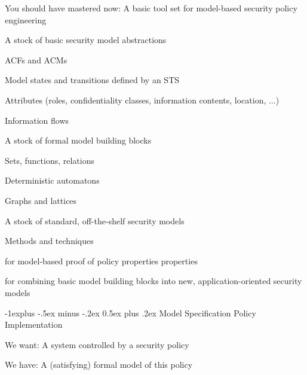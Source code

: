 \documentclass[a4paper]{article}
\makeatletter
\renewcommand{\subsection}{\@startsection{subsection}{2}{0mm}%
                                {-1explus -.5ex minus -.2ex}%
                                {0.5ex plus .2ex}%
                                {\normalfont\normalsize\bfseries}}
\makeatother
\begin{document}
\begin{multicols}{3}
    You should have mastered now: A basic tool set for model-based security policy engineering
    \begin{itemize*}
        \item A stock of basic security model abstractions
        \begin{itemize*}
            \item ACFs and ACMs
            \item Model states and transitions defined by an STS
            \item Attributes (roles, confidentiality classes, information contents, location, ...)
            \item Information flows
        \end{itemize*}
        \item A stock of formal model building blocks
        \begin{itemize*}
            \item Sets, functions, relations
            \item Deterministic automatons
            \item Graphs and lattices
        \end{itemize*}
        \item A stock of standard, off-the-shelf security models
        \item Methods and techniques
        \begin{itemize*}
            \item for model-based proof of policy properties properties
            \item for combining basic model building blocks into new, application-oriented security models
        \end{itemize*}
    \end{itemize*}

    \subsection{Model Specification}
    Policy Implementation
    \begin{itemize*}
        \item We want: A system controlled by a security policy
        \item We have: A (satisfying) formal model of this policy
    \end{itemize*}


\end{multicols}
\end{document}
